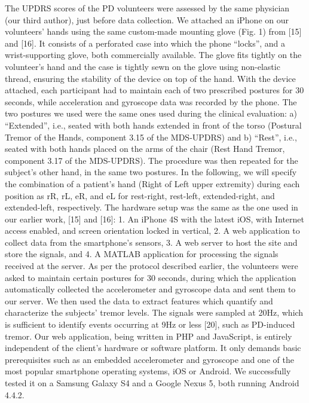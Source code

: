 The UPDRS scores of the PD volunteers were assessed by the same physician (our third author), just before data collection. We attached an iPhone on our volunteers’ hands using the same custom-made mounting glove (Fig. 1) from [15] and [16]. It consists of a perforated case into which the phone “locks”, and a wrist-supporting glove, both commercially available. The glove fits tightly on the volunteer’s hand and the case is tightly sewn on the glove using non-elastic thread, ensuring the stability of the device on top of the hand. With the device attached, each participant had to maintain each of two prescribed postures for 30 seconds, while acceleration and gyroscope data was recorded by the phone. The two postures we used were the same ones used during the clinical evaluation: a) “Extended”, i.e., seated with both hands extended in front of the torso (Postural Tremor of the Hands, component 3.15 of the MDS-UPDRS) and b) “Rest”, i.e., seated with both hands placed on the arms of the chair (Rest Hand Tremor, component 3.17 of the MDS-UPDRS). The procedure was then repeated for the subject’s other hand, in the same two postures. In the following, we will specify the combination of a patient’s hand (Right of Left upper extremity) during each position as rR, rL, eR, and eL for rest-right, rest-left, extended-right, and extended-left, respectively.
The hardware setup was the same as the one used in our earlier work, [15] and [16]: 
1.	An iPhone 4S with the latest iOS, with Internet access enabled, and screen orientation locked in vertical,
2.	A web application to collect data from the smartphone’s sensors,
3.	A web server to host the site and store the signals, and
4.	A MATLAB application for processing the signals received at the server.
As per the protocol described earlier, the volunteers were asked to maintain certain postures for 30 seconds, during which the application automatically collected the accelerometer and gyroscope data and sent them to our server. We then used the data to extract features which quantify and characterize the subjects’ tremor levels. The signals were sampled at 20Hz, which is sufficient to identify events occurring at 9Hz or less [20], such as PD-induced tremor. 
Our web application, being written in PHP and JavaScript, is entirely independent of the client's hardware or software platform. It only demands basic prerequisites such as an embedded accelerometer and gyroscope and one of the most popular smartphone operating systems, iOS or Android. We successfully tested it on a Samsung Galaxy S4 and a Google Nexus 5, both running Android 4.4.2. 

